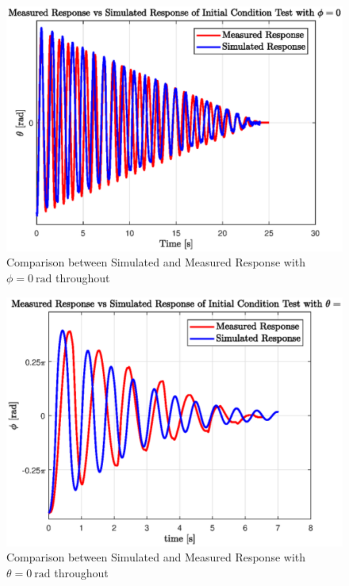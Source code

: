 \begin{figure}[h]
	\centering
	\includegraphics[scale=1]{./figs/sim_vs_measured_q1.eps}
	\caption{Comparison between Simulated and Measured Response with $\phi = \SI{0}{\radian}$ throughout}
	\label{fig:sim_vs_measured_q1}
\end{figure}

\begin{figure}[h]
	\centering
	\includegraphics[scale=1]{./figs/sim_vs_measured_q2.eps}
	\caption{Comparison between Simulated and Measured Response with $\theta = \SI{0}{\radian}$ throughout}
	\label{fig:sim_vs_measured_q2}
\end{figure}


